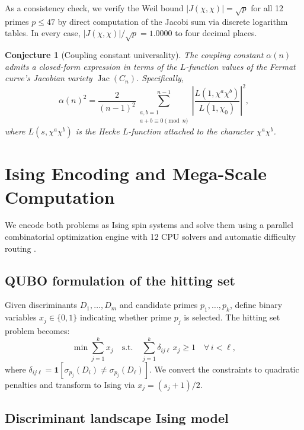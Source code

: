 \documentclass[11pt]{amsart}
\newtheorem{conjecture}[theorem]{Conjecture}
\theoremstyle{definition}
\begin{document}
As a consistency check, we verify the Weil bound $|J(\chi, \chi)| = \sqrt{p}$ for all 12 primes $p \leq 47$ by direct computation of the Jacobi sum via discrete logarithm tables. In every case, $|J(\chi, \chi)|/\sqrt{p} = 1.0000$ to four decimal places.

\begin{conjecture}[Coupling constant universality]\label{conj:coupling}
The coupling constant $\alpha(n)$ admits a closed-form expression in terms of the $L$-function values of the Fermat curve's Jacobian variety $\operatorname{Jac}(C_n)$. Specifically,
\[
\alpha(n)^2 = \frac{2}{(n-1)^2} \sum_{\substack{a,b=1 \\ a+b \equiv 0 \pmod{n}}}^{n-1} \left| \frac{L(1, \chi^a \chi^b)}{L(1, \chi_0)} \right|^2,
\]
where $L(s, \chi^a \chi^b)$ is the Hecke $L$-function attached to the character $\chi^a \chi^b$.
\end{conjecture}


\section{Ising Encoding and Mega-Scale Computation}
\label{sec:ising}

We encode both problems as Ising spin systems and solve them using a parallel combinatorial optimization engine with 12 CPU solvers and automatic difficulty routing \cite{dsc3engine}.

\subsection{QUBO formulation of the hitting set}

Given discriminants $D_1, \ldots, D_m$ and candidate primes $p_1, \ldots, p_k$, define binary variables $x_j \in \{0, 1\}$ indicating whether prime $p_j$ is selected. The hitting set problem becomes:
\begin{equation}\label{eq:qubo}
\min \sum_{j=1}^k x_j \quad \text{s.t.} \quad \sum_{j=1}^k \delta_{ij\ell}\, x_j \geq 1 \quad \forall\, i < \ell,
\end{equation}
where $\delta_{ij\ell} = \mathbf{1}\!\left[\sigma_{p_j}(D_i) \neq \sigma_{p_j}(D_\ell)\right]$. We convert the constraints to quadratic penalties and transform to Ising via $x_j = (s_j + 1)/2$.

\subsection{Discriminant landscape Ising model}
\label{sec:landscape}
\end{document}
